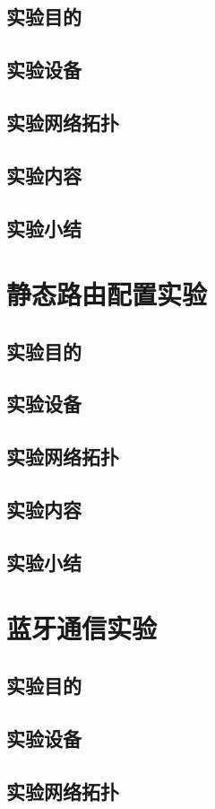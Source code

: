 \documentclass[lang=cn,11pt,a4paper,cite=authoryear]{elegantpaper}
\begin{document}
\subsection{实验目的}
\subsection{实验设备}
\subsection{实验网络拓扑}
\subsection{实验内容}
\subsection{实验小结}
\section{静态路由配置实验}
\subsection{实验目的}
\subsection{实验设备}
\subsection{实验网络拓扑}
\subsection{实验内容}
\subsection{实验小结}
\section{蓝牙通信实验}
\subsection{实验目的}
\subsection{实验设备}
\subsection{实验网络拓扑}
\end{document}
